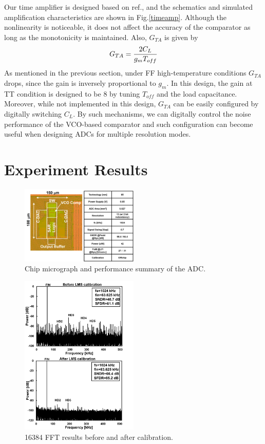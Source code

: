 \documentclass[journal]{IEEEtran}
\begin{document}
Our time amplifier is designed based on ref.\cite{lee20089}, and the schematics and simulated amplification characteristics are shown in Fig.\ref{timeamp}. Although the nonlinearity is noticeable, it does not affect the accuracy of the comparator as long as the monotonicity is maintained.
Also, $G_{TA}$ is given by
\begin{eqnarray}
    \centering
    G_{TA} = \frac{2C_L}{g_mT_{off}}
    \label{gta}
\end{eqnarray}
As mentioned in the previous section, under FF high-temperature conditions $G_{TA}$ drops, since the gain is inversely proportional to $g_m$.
In this design, the gain at TT condition is designed to be 8 by tuning $T_{off}$ and the load capacitance. Moreover, while not implemented in this design, $G_{TA}$ can be easily configured by digitally switching $C_L$. By such mechanisms, we can digitally control the noise performance of the VCO-based comparator and such configuration can become useful when designing ADCs for multiple resolution modes\cite{harpe201310b}.

\section{Experiment Results}
\begin{figure}[!]
\centering
 \includegraphics[width=0.5\textwidth]{figs/chipphoto.png}
  \caption{Chip micrograph and performance summary of the ADC.}
  \label{chipphoto}
\end{figure}

\begin{figure}[!]
\centering
 \includegraphics[width=0.5\textwidth]{figs/fft.png}
  \caption{16384 FFT results before and after calibration.}
  \label{aftercal}
\end{figure}
\end{document}
